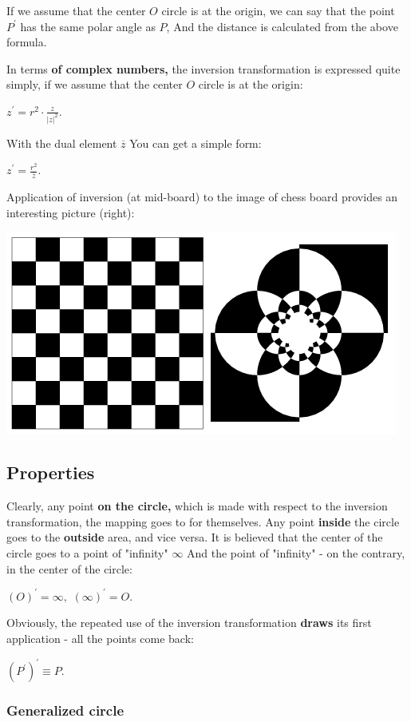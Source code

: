 If we assume that the center $O$ circle is at the origin, we can say that the point $P ^ \prime$ has the same polar angle as $P$, And the distance is calculated from the above formula.

In terms \textbf{of complex numbers,} the inversion transformation is expressed quite simply, if we assume that the center $O$ circle is at the origin:

$z ^ \prime = r ^ 2 \cdot \frac {z} {| z | ^ 2}.$

With the dual element $\overline {z}$ You can get a simple form:

$z ^ \prime = \frac {r ^ 2} {\overline {z}}.$

Application of inversion (at mid-board) to the image of chess board provides an interesting picture (right):

\includegraphics[scale=0.5]{7.png}

\subsection{ Properties }

Clearly, any point \textbf{on the circle,} which is made ​​with respect to the inversion transformation, the mapping goes to for themselves. Any point \textbf{inside} the circle goes to the \textbf{outside} area, and vice versa. It is believed that the center of the circle goes to a point of "infinity" $\infty$ And the point of "infinity" - on the contrary, in the center of the circle:

$(O) ^ \prime = \infty,$
$(\infty) ^ \prime = O.$

Obviously, the repeated use of the inversion transformation \textbf{draws} its first application - all the points come back:

$\left (P ^ \prime \right) ^ \prime \equiv P.$

\subsubsection{ Generalized circle }

